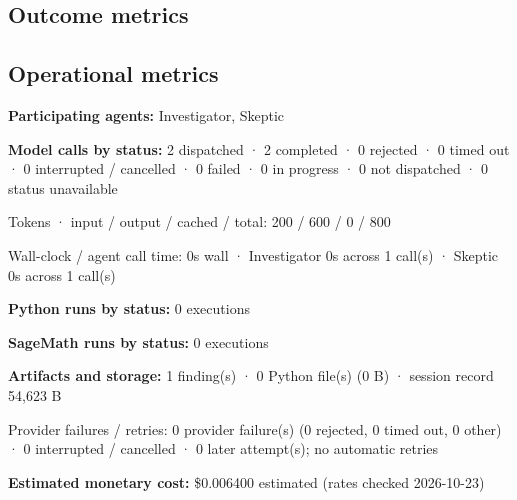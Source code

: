 \documentclass[11pt]{article}
\begin{document}
\subsection{Outcome metrics}
\subsection{Operational metrics}
\textbf{Participating agents:} Investigator, Skeptic\par
\textbf{Model calls by status:} 2 dispatched · 2 completed · 0 rejected · 0 timed out · 0 interrupted / cancelled · 0 failed · 0 in progress · 0 not dispatched · 0 status unavailable\par
Tokens · input / output / cached / total: 200 / 600 / 0 / 800\par
Wall-clock / agent call time: 0s wall · Investigator 0s across 1 call(s) · Skeptic 0s across 1 call(s)\par
\textbf{Python runs by status:} 0 executions\par
\textbf{SageMath runs by status:} 0 executions\par
\textbf{Artifacts and storage:} 1 finding(s) · 0 Python file(s) (0 B) · session record 54,623 B\par
Provider failures / retries: 0 provider failure(s) (0 rejected, 0 timed out, 0 other) · 0 interrupted / cancelled · 0 later attempt(s); no automatic retries\par
\textbf{Estimated monetary cost:} \$0.006400 estimated (rates checked 2026-10-23)\par
\end{document}
